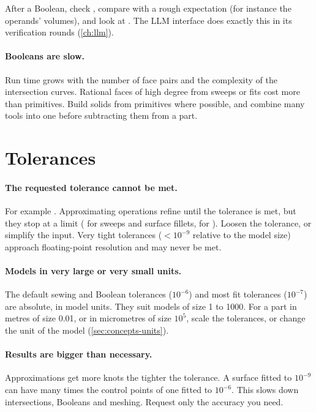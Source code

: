 \begin{tip}
After a Boolean, check , compare  with a rough
expectation (for instance the operands' volumes), and look at . The LLM
interface does exactly this in its verification rounds (\cref{ch:llm}).
\end{tip}

\paragraph{Booleans are slow.}
Run time grows with the number of face pairs and the complexity of the intersection curves.
Rational faces of high degree from sweeps or fits cost more than primitives. Build solids
from primitives where possible, and combine many tools into one before subtracting them from a
part.

\section{Tolerances}\label{sec:ts-tolerances}

\paragraph{The requested tolerance cannot be met.}
For example . Approximating
operations refine until the tolerance is met, but they stop at a limit
( for sweeps and surface fillets,  for
). Loosen the tolerance, or simplify the input. Very tight tolerances
($<10^{-9}$ relative to the model size) approach floating-point resolution and may never be
met.

\paragraph{Models in very large or very small units.}
The default sewing and Boolean tolerances ($10^{-6}$) and most fit tolerances ($10^{-7}$) are
absolute, in model units. They suit models of size 1 to 1000. For a part in metres of size 0.01,
or in micrometres of size $10^5$, scale the tolerances, or change the unit of the model
(\cref{sec:concepts-units}).

\paragraph{Results are bigger than necessary.}
Approximations get more knots the tighter the tolerance. A surface fitted to $10^{-9}$ can have
many times the control points of one fitted to $10^{-6}$. This slows down intersections,
Booleans and meshing. Request only the accuracy you need.

